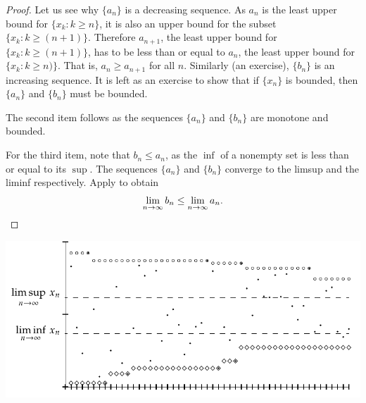 \begin{proof}
Let us see why $\{ a_n \}$ is a decreasing sequence.  As $a_n$ is the least upper
bound for $\{ x_k : k \geq n \}$, it is also
an upper bound for the subset $\{ x_k : k \geq (n+1) \}$.  Therefore
$a_{n+1}$, the least upper bound for
$\{ x_k : k \geq (n+1) \}$, has to be less than or equal to $a_n$,
the least upper bound for
$\{ x_k : k \geq n) \}$.
That is,
$a_n \geq a_{n+1}$ for all $n$.  Similarly (an exercise), $\{ b_n \}$ is an increasing
sequence.  It is left as an exercise to show that
if $\{ x_n \}$ is bounded, then $\{ a_n \}$ and $\{ b_n \}$ must be bounded.

The second item follows as the sequences
$\{ a_n \}$ and $\{ b_n \}$ are monotone and bounded.

For the third item, note that $b_n \leq a_n$, as the $\inf$ of a nonempty set
is less than or equal to its $\sup$.  The sequences $\{ a_n \}$ and $\{ b_n \}$
converge to the limsup and the liminf respectively.
Apply  to obtain
\begin{equation*}
\lim_{n\to \infty} b_n \leq \lim_{n\to \infty} a_n.  \qedhere
\end{equation*}
\end{proof}
\begin{myfigureht}
\includegraphics{figures/sequence-limsupliminf_an_bn}
\caption{First 50 terms of an example sequence.  Terms $x_n$ of the sequence are
marked with dots
(\raisebox{0.25ex}{\tiny$\bullet$}),
$a_n$ are marked with
circles ($\circ$), and
$b_n$ are marked with diamonds ($\diamond$).\label{sequence-limsupliminf_an_bn}}
\end{myfigureht}

